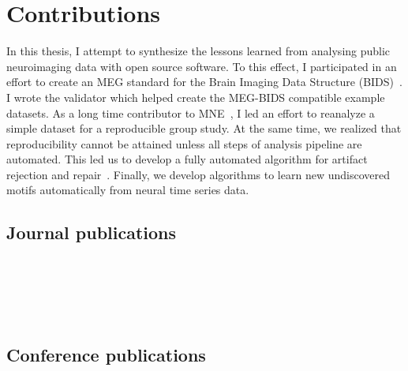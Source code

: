 \section{Contributions}
In this thesis, I attempt to synthesize the lessons learned from analysing public neuroimaging data with open source software. To this effect, I participated in an effort to create an MEG standard for the Brain Imaging Data Structure (BIDS)~\citep{galan2017meg}. I wrote the validator which helped create the MEG-BIDS compatible example datasets. As a long time contributor to MNE~\citep{gramfort2013meg}, I led an effort to reanalyze a simple dataset for a reproducible group study. At the same time, we realized that reproducibility cannot be attained unless all steps of analysis pipeline are automated. This led us to develop a fully automated algorithm for artifact rejection and repair~\citep{jas2016automated, jas2017autoreject}. Finally, we develop algorithms to learn new undiscovered motifs automatically from neural time series data. 

\subsection*{Journal publications}
 \\ \\
 \\ \\

\subsection*{Conference publications}
 \\ \\
